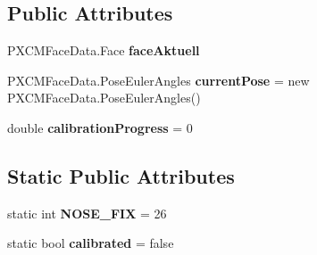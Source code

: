 \subsection*{Public Attributes}
\begin{DoxyCompactItemize}
\item 
P\+X\+C\+M\+Face\+Data.\+Face \textbf{ face\+Aktuell}
\item 
P\+X\+C\+M\+Face\+Data.\+Pose\+Euler\+Angles \textbf{ current\+Pose} = new P\+X\+C\+M\+Face\+Data.\+Pose\+Euler\+Angles()
\item 
double \textbf{ calibration\+Progress} = 0
\end{DoxyCompactItemize}
\subsection*{Static Public Attributes}
\begin{DoxyCompactItemize}
\item 
static int \textbf{ N\+O\+S\+E\+\_\+\+F\+IX} = 26
\item 
static bool \textbf{ calibrated} = false
\end{DoxyCompactItemize}
